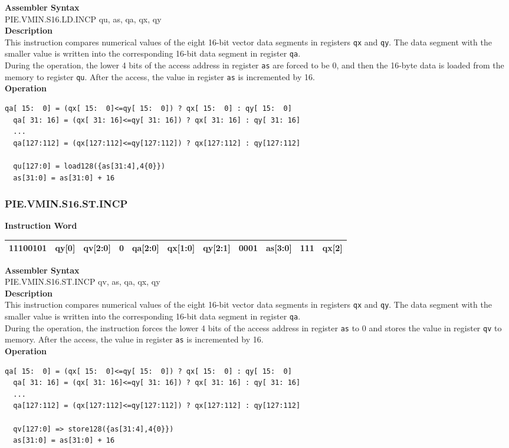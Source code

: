 \textbf{Assembler Syntax} \\
PIE.VMIN.S16.LD.INCP qu, as, qa, qx, qy \\
\textbf{Description} \\
This instruction compares numerical values of the eight 16-bit vector data segments in registers \lstinline{qx} and \lstinline{qy}. The data segment with the smaller value is written into the corresponding 16-bit data segment in register \lstinline{qa}.\\
During the operation, the lower 4 bits of the access address in register \lstinline{as} are forced to be 0, and then the 16-byte data is loaded from the memory to register \lstinline{qu}. After the access, the value in register \lstinline{as} is incremented by 16.\\
\textbf{Operation}
\begin{lstlisting}[escapeinside=`?]
  qa[ 15:  0] = (qx[ 15:  0]<=qy[ 15:  0]) ? qx[ 15:  0] : qy[ 15:  0]
  qa[ 31: 16] = (qx[ 31: 16]<=qy[ 31: 16]) ? qx[ 31: 16] : qy[ 31: 16]
  ...
  qa[127:112] = (qx[127:112]<=qy[127:112]) ? qx[127:112] : qy[127:112]

  qu[127:0] = load128({as[31:4],4{0}})
  as[31:0] = as[31:0] + 16
\end{lstlisting}

\newpage
\subsubsection{PIE.VMIN.S16.ST.INCP}\label{instruction:PIEVMINS16STINCP}
\setlength\tabcolsep{6pt}
\textbf{Instruction Word} \\
\begin{tabular}{|c|c|c|c|c|c|c|c|c|c|c|}
	\hline
	11100101 & qy[0] & qv[2:0] & 0 & qa[2:0] & qx[1:0] & qy[2:1] & 0001 & as[3:0] & 111 & qx[2] \\
	\hline
\end{tabular}

\textbf{Assembler Syntax} \\
PIE.VMIN.S16.ST.INCP qv, as, qa, qx, qy \\
\textbf{Description} \\
This instruction compares numerical values of the eight 16-bit vector data segments in registers \lstinline{qx} and \lstinline{qy}. The data segment with the smaller value is written into the corresponding 16-bit data segment in register \lstinline{qa}.\\
During the operation, the instruction forces the lower 4 bits of the access address in register \lstinline{as} to 0 and stores the value in register \lstinline{qv} to memory. After the access, the value in register \lstinline{as} is incremented by 16.\\
\textbf{Operation}
\begin{lstlisting}[escapeinside=`?]
  qa[ 15:  0] = (qx[ 15:  0]<=qy[ 15:  0]) ? qx[ 15:  0] : qy[ 15:  0]
  qa[ 31: 16] = (qx[ 31: 16]<=qy[ 31: 16]) ? qx[ 31: 16] : qy[ 31: 16]
  ...
  qa[127:112] = (qx[127:112]<=qy[127:112]) ? qx[127:112] : qy[127:112]

  qv[127:0] => store128({as[31:4],4{0}})
  as[31:0] = as[31:0] + 16
\end{lstlisting}

